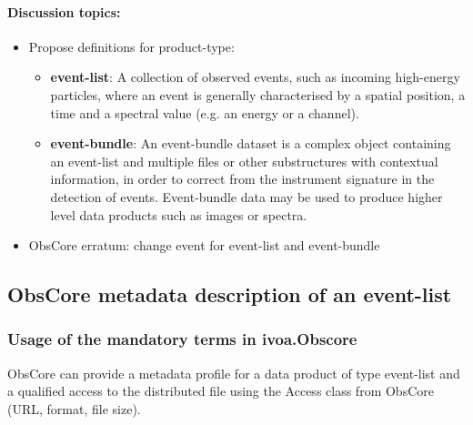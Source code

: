\documentclass[11pt,a4paper]{ivoa}
\begin{document}
\paragraph{Discussion topics:}
\begin{itemize}
    \item Propose definitions for product-type:
    \begin{itemize}
        \item \textbf{event-list}: A collection of observed events, such as incoming high-energy particles, where an event is generally characterised by a spatial position, a time and a spectral value (e.g. an energy or a channel).
        \item \textbf{event-bundle}: An event-bundle dataset is a complex object containing an event-list and multiple files or other substructures with contextual information, in order to correct from the instrument signature in the detection of events. Event-bundle data may be used to produce higher level data products such as images or spectra.
    \end{itemize}

    \item ObsCore erratum: change event for event-list and event-bundle

\end{itemize}


\subsection{ObsCore metadata description of an event-list}
%


\subsubsection{Usage of the mandatory terms in ivoa.Obscore}

ObsCore \citep{2017ivoa.spec.0509L} can provide a metadata profile for a data product of type event-list and a qualified access to the distributed file using the Access class from ObsCore (URL, format, file size).
\end{document}
